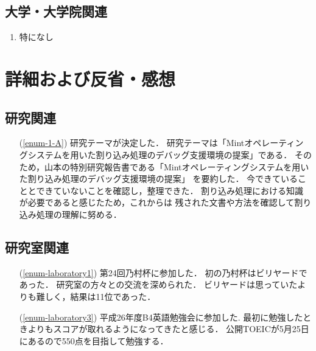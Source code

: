 \documentclass[fleqn, 14pt]{extarticle}
\begin{document}
\subsection{大学・大学院関連}
\label{sec-2-3}

\begin{enumerate}
\item 特になし
\hfill
\end{enumerate}





\section{詳細および反省・感想}
\label{sec-3}
\subsection{研究関連}
\label{sec-3-1}

\begin{itemize}
\item[(\ref{enum-1-A})]
研究テーマが決定した．
研究テーマは「Mintオペレーティングシステムを用いた割り込み処理のデバッグ支援環境の提案」である．
そのため，山本の特別研究報告書である「Mintオペレーティングシステムを用いた割り込み処理のデバッグ支援環境の提案」
を要約した．
今できていることとできていないことを確認し，整理できた．
割り込み処理における知識が必要であると感じたため，これからは
残された文書や方法を確認して割り込み処理の理解に努める．

\end{itemize}

\subsection{研究室関連}
\label{sec-3-2}

\begin{itemize}
\item[(\ref{enum-laboratory1})]
第24回乃村杯に参加した．
初の乃村杯はビリヤードであった．
研究室の方々との交流を深められた．
ビリヤードは思っていたよりも難しく，結果は11位であった．
\item[(\ref{enum-laboratory3})]
平成26年度B4英語勉強会に参加した.
最初に勉強したときよりもスコアが取れるようになってきたと感じる．
公開TOEICが5月25日にあるので550点を目指して勉強する．
\end{itemize}
\end{document}

